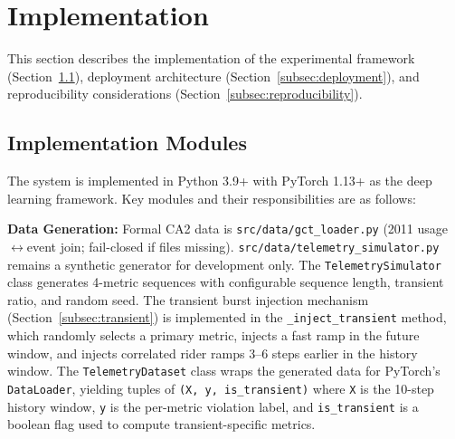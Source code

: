 
\section{Implementation}
\label{sec:Implementation}

This section describes the implementation of the experimental framework (Section~\ref{subsec:impl_modules}), deployment architecture (Section~\ref{subsec:deployment}), and reproducibility considerations (Section~\ref{subsec:reproducibility}).

\subsection{Implementation Modules}
\label{subsec:impl_modules}

The system is implemented in Python 3.9+ with PyTorch 1.13+ as the deep learning framework. Key modules and their responsibilities are as follows:

\textbf{Data Generation:} Formal CA2 data is \texttt{src/data/gct\_loader.py} (2011 usage$\leftrightarrow$event join; fail-closed if files missing). \texttt{src/data/telemetry\_simulator.py} remains a synthetic generator for development only. The \texttt{TelemetrySimulator} class generates 4-metric sequences with configurable sequence length, transient ratio, and random seed. The transient burst injection mechanism (Section~\ref{subsec:transient}) is implemented in the \texttt{\_inject\_transient} method, which randomly selects a primary metric, injects a fast ramp in the future window, and injects correlated rider ramps 3--6 steps earlier in the history window. The \texttt{TelemetryDataset} class wraps the generated data for PyTorch's \texttt{DataLoader}, yielding tuples of \texttt{(X, y, is\_transient)} where \texttt{X} is the 10-step history window, \texttt{y} is the per-metric violation label, and \texttt{is\_transient} is a boolean flag used to compute transient-specific metrics.

